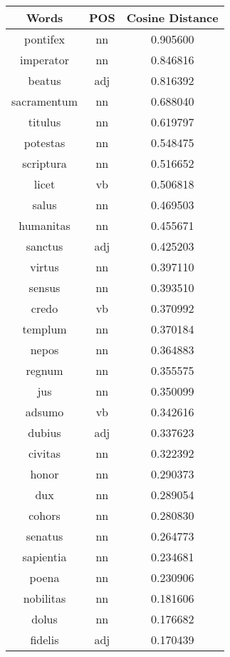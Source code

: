 \begin{table}[h]
\centering
\begin{tabular}{ccc} 
\toprule
Words       & POS & Cosine Distance  \\ 
\midrule
pontifex    & nn  & 0.905600         \\
imperator   & nn  & 0.846816         \\
beatus      & adj & 0.816392         \\
sacramentum & nn  & 0.688040         \\
titulus     & nn  & 0.619797         \\
potestas    & nn  & 0.548475         \\
scriptura   & nn  & 0.516652         \\
licet       & vb  & 0.506818         \\
salus       & nn  & 0.469503         \\
humanitas   & nn  & 0.455671         \\
sanctus     & adj & 0.425203         \\
virtus      & nn  & 0.397110         \\
sensus      & nn  & 0.393510         \\
credo       & vb  & 0.370992         \\
templum     & nn  & 0.370184         \\
nepos       & nn  & 0.364883         \\
regnum      & nn  & 0.355575         \\
jus         & nn  & 0.350099         \\
adsumo      & vb  & 0.342616         \\
dubius      & adj & 0.337623         \\
civitas     & nn  & 0.322392         \\
honor       & nn  & 0.290373         \\
dux         & nn  & 0.289054         \\
cohors      & nn  & 0.280830         \\
senatus     & nn  & 0.264773         \\
sapientia   & nn  & 0.234681         \\
poena       & nn  & 0.230906         \\
nobilitas   & nn  & 0.181606         \\
dolus       & nn  & 0.176682         \\
fidelis     & adj & 0.170439         \\

\end{tabular}
\end{table}
